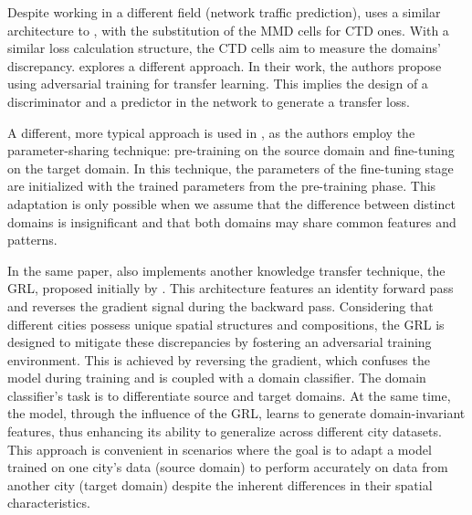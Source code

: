 Despite working in a different field (network traffic prediction), \cite{Wang202222} uses a similar architecture to \cite{Wang20224695}, with the substitution of the \gls{MMD} cells for \gls{CTD} ones. With a similar loss calculation structure, the \gls{CTD} cells aim to measure the domains' discrepancy. \cite{Ouyang20231} explores a different approach. In their work, the authors propose using adversarial training for transfer learning. This implies the design of a discriminator and a predictor in the network to generate a transfer loss.

A different, more typical approach is used in \cite{Tang2022}, as the authors employ the parameter-sharing technique: pre-training on the source domain and fine-tuning on the target domain. In this technique, the parameters of the fine-tuning stage are initialized with the trained parameters from the pre-training phase. This adaptation is only possible when we assume that the difference between distinct domains is insignificant and that both domains may share common features and patterns.


In the same paper, \cite{Tang2022} also implements another knowledge transfer technique, the \gls{GRL}, proposed initially by \cite{ganin2015unsupervised}. This architecture features an identity forward pass and reverses the gradient signal during the backward pass. Considering that different cities possess unique spatial structures and compositions, the \gls{GRL} is designed to mitigate these discrepancies by fostering an adversarial training environment. This is achieved by reversing the gradient, which confuses the model during training and is coupled with a domain classifier. The domain classifier's task is to differentiate source and target domains. At the same time, the model, through the influence of the GRL, learns to generate domain-invariant features, thus enhancing its ability to generalize across different city datasets. This approach is convenient in scenarios where the goal is to adapt a model trained on one city's data (source domain) to perform accurately on data from another city (target domain) despite the inherent differences in their spatial characteristics.









